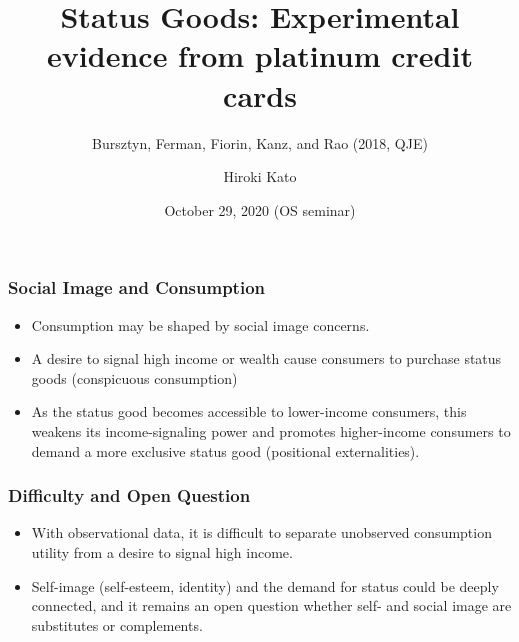 \documentclass[unicode,12pt]{beamer}
\title{Status Goods: Experimental evidence from platinum credit cards}
\subtitle{Bursztyn, Ferman, Fiorin, Kanz, and Rao (2018, QJE)}
\author{Hiroki Kato}
\date{October 29, 2020 (OS seminar)}
\begin{document}
    \maketitle

    \begin{frame}
        \frametitle{Social Image and Consumption}
    
        \begin{itemize}
            \item Consumption may be shaped by social image concerns.
            \item A desire to signal high income or wealth cause consumers to purchase status goods (conspicuous consumption)
            \item As the status good becomes accessible to lower-income consumers, this weakens its income-signaling power and promotes higher-income consumers to demand a more exclusive status good (positional externalities).
        \end{itemize}
    
    \end{frame}

    \begin{frame}
        \frametitle{Difficulty and Open Question}
    
        \begin{itemize}
            \item With observational data, it is difficult to separate unobserved consumption utility from a desire to signal high income.
            \item Self-image (self-esteem, identity) and the demand for status could be deeply connected, and it remains an open question whether self- and social image are substitutes or complements.
        \end{itemize}
    
    \end{frame}
\end{document}
